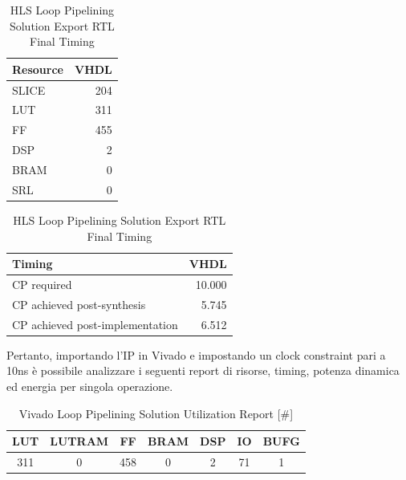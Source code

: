 \begin{table}[H]
    \centering
    \begin{minipage}[t]{0.45\linewidth}
        \centering
        \begin{tabular}{|l|r|}
            \hline
            \textbf{Resource} & \textbf{VHDL} \\
            \hline
            SLICE & 204 \\
            \hline
            LUT & 311 \\
            \hline
            FF & 455 \\
            \hline
            DSP & 2 \\
            \hline
            BRAM & 0 \\
            \hline
            SRL & 0 \\
            \hline
        \end{tabular}
        \caption{HLS Loop Pipelining Solution Export RTL Resource Usage}
        \label{tab:hls-loop-pipelining-solution-export-rtl-resoruce-usage}
    \end{minipage}
    \hfill
    \begin{minipage}[t]{0.45\linewidth}
        \centering
        \begin{tabular}{|l|r|}
            \hline
            \textbf{Timing} & \textbf{VHDL} \\
            \hline
            CP required & 10.000 \\
            \hline
            CP achieved post-synthesis & 5.745 \\
            \hline
            CP achieved post-implementation & 6.512 \\
            \hline
        \end{tabular}
        \caption{HLS Loop Pipelining Solution Export RTL Final Timing}
        \label{tab:hls-loop-pipelining-solution-export-rtl-final-timing}
    \end{minipage}
\end{table}



Pertanto, importando l'IP in Vivado e impostando un clock constraint pari a 10ns è possibile analizzare i seguenti report di risorse, timing, potenza dinamica ed energia per singola operazione.


\begin{table}[H]
    \centering
    \begin{tabular}{|c|c|c|c|c|c|c|}
        \hline
        \textbf{LUT} & \textbf{LUTRAM} & \textbf{FF} & \textbf{BRAM} & \textbf{DSP} & \textbf{IO} & \textbf{BUFG} \\
        \hline
        311 & 0 & 458 & 0 & 2 & 71 & 1 \\
        \hline
    \end{tabular}
    \caption{Vivado Loop Pipelining Solution Utilization Report [\#]}
    \label{tab:vivado-loop-pipelining-solution-utilization-reproot}
\end{table}

